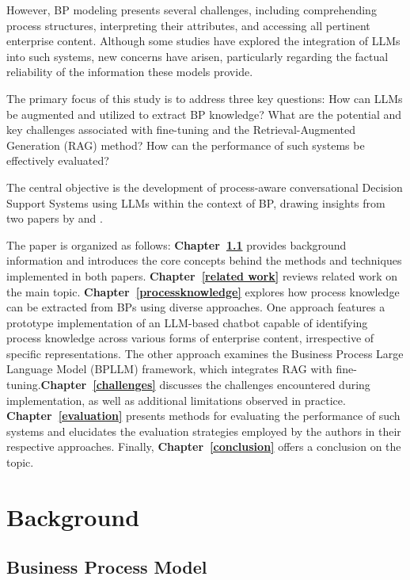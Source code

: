 \documentclass[%
    paper=A4,                    %
    twoside=true,               %
    openright,                  %
    parskip=full,               %
    chapterprefix=true,         %
    11pt,                       %
    headings=normal,            %
    bibliography=totoc,         %
    listof=totoc,              %
    titlepage=on,              %
    captions=tableabove,        %
    draft=false,               %
]{scrreprt}%
\begin{document}
However, BP modeling presents several challenges, including comprehending process structures, interpreting their attributes, and accessing all pertinent enterprise content. Although some studies have explored the integration of LLMs into such systems, new concerns have arisen, particularly regarding the factual reliability of the information these models provide.

The primary focus of this study is to address three key questions: How can LLMs be augmented and utilized to extract BP knowledge? What are the potential and key challenges associated with fine-tuning and the Retrieval-Augmented Generation (RAG) method? How can the performance of such systems be effectively evaluated?

The central objective is the development of process-aware conversational Decision Support Systems using LLMs within the context of BP, drawing insights from two papers by \cite{franzoi2024using} and \cite{bernardi2024conversing}.

The paper is organized as follows: \textbf{Chapter~\ref{Background}} provides background information and introduces the core concepts behind the methods and techniques implemented in both papers. \textbf{Chapter~\ref{related work}} reviews related work on the main topic. \textbf{Chapter~\ref{processknowledge}} explores how process knowledge can be extracted from BPs using diverse approaches. One approach features a prototype implementation of an LLM-based chatbot capable of identifying process knowledge across various forms of enterprise content, irrespective of specific representations. The other approach examines the Business Process Large Language Model (BPLLM) framework, which integrates RAG with fine-tuning.\textbf{Chapter~\ref{challenges}} discusses the challenges encountered during implementation, as well as additional limitations observed in practice. \textbf{Chapter~\ref{evaluation}} presents methods for evaluating the performance of such systems and elucidates the evaluation strategies employed by the authors in their respective approaches. Finally, \textbf{Chapter~\ref{conclusion}} offers a conclusion on the topic.



\chapter{Background}
\section{Business Process Model}
\label{Background}
\end{document}
